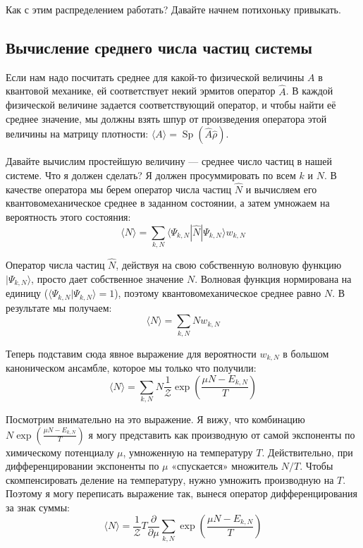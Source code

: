 \documentclass[../general/general]{subfiles}
\begin{document}
Как с этим распределением работать? Давайте начнем потихоньку привыкать. 

\subsection{Вычисление среднего числа частиц системы}

Если нам надо посчитать среднее для какой-то физической величины $A$ в квантовой механике, ей соответствует некий эрмитов оператор $\hat{A}$. В каждой физической величине задается соответствующий оператор, и чтобы найти её среднее значение, мы должны взять шпур от произведения оператора этой величины на матрицу плотности: $\langle A \rangle = \operatorname{Sp}(\hat{A}\hat{\rho})$.

Давайте вычислим простейшую величину — среднее число частиц в нашей системе. Что я должен сделать? Я должен просуммировать по всем $k$ и $N$. В качестве оператора мы берем оператор числа частиц $\hat{N}$ и вычисляем его квантовомеханическое среднее в заданном состоянии, а затем умножаем на вероятность этого состояния:
\begin{equation*}
    \langle N \rangle = \sum_{k, N} \langle \Psi_{k, N} | \hat{N} | \Psi_{k, N} \rangle w_{k, N}
\end{equation*}

Оператор числа частиц $\hat{N}$, действуя на свою собственную волновую функцию $|\Psi_{k, N}\rangle$, просто дает собственное значение $N$. Волновая функция нормирована на единицу ($\langle \Psi_{k, N} | \Psi_{k, N} \rangle = 1$), поэтому квантовомеханическое среднее равно $N$. В результате мы получаем:
\begin{equation*}
    \langle N \rangle = \sum_{k, N} N w_{k, N}
\end{equation*}

Теперь подставим сюда явное выражение для вероятности $w_{k, N}$ в большом каноническом ансамбле, которое мы только что получили:
\begin{equation*}
    \langle N \rangle = \sum_{k, N} N \frac{1}{\mathcal{Z}} \exp\left( \frac{\mu N - E_{k, N}}{T} \right)
\end{equation*}

Посмотрим внимательно на это выражение. Я вижу, что комбинацию $N \exp\left( \frac{\mu N - E_{k, N}}{T} \right)$ я могу представить как производную от самой экспоненты по химическому потенциалу $\mu$, умноженную на температуру $T$. Действительно, при дифференцировании экспоненты по $\mu$ «спускается» множитель $N/T$. Чтобы скомпенсировать деление на температуру, нужно умножить производную на $T$. Поэтому я могу переписать выражение так, вынеся оператор дифференцирования за знак суммы:
\begin{equation*}
    \langle N \rangle = \frac{1}{\mathcal{Z}} T \frac{\partial}{\partial \mu} \sum_{k, N} \exp\left( \frac{\mu N - E_{k, N}}{T} \right)
\end{equation*}
\end{document}
